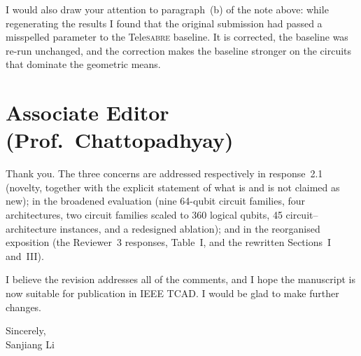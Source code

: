 \documentclass[11pt]{article}
\newcommand{\TeleSABRE}{Tele\textsc{sabre}}
\begin{document}
I would also draw your attention to paragraph~(b) of the note above: while
regenerating the results I found that the original submission had passed a
misspelled parameter to the \TeleSABRE{} baseline. It is corrected, the
baseline was re-run unchanged, and the correction makes the baseline stronger
on the circuits that dominate the geometric means.

\section*{Associate Editor (Prof.\ Chattopadhyay)}

Thank you. The three concerns are addressed respectively in response~2.1
(novelty, together with the explicit statement of what is and is not claimed
as new); in the broadened evaluation (nine 64-qubit circuit families, four
architectures, two circuit families scaled to 360 logical qubits, 45
circuit--architecture instances, and a redesigned ablation); and in the
reorganised exposition (the Reviewer~3 responses, Table~I, and the rewritten
Sections~I and~III).

\bigskip\noindent
I believe the revision addresses all of the comments, and I hope the
manuscript is now suitable for publication in IEEE TCAD. I would be glad to
make further changes.

\bigskip\noindent
Sincerely,\\
Sanjiang Li
\end{document}
